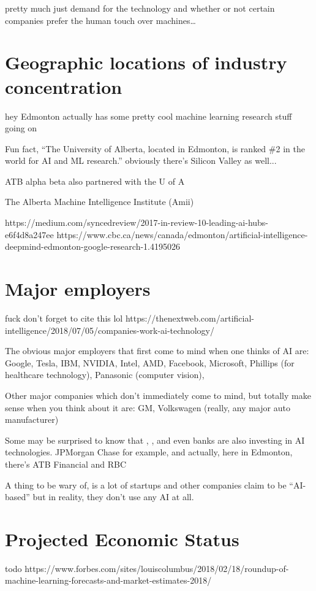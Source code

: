 \documentclass[letterpaper,12pt]{article}
\begin{document}
pretty much just demand for the technology and whether or not
certain companies prefer the human touch over machines\dots

\section{Geographic locations of industry concentration}
hey Edmonton actually has some pretty cool machine learning research stuff
going on

Fun fact, ``The University of Alberta, located in Edmonton, is ranked \#2 in the world for AI and ML research.''
obviously there's Silicon Valley as well...

ATB alpha beta
also partnered with the U of A

The
Alberta
Machine
Intelligence
Institute
(Amii)

https://medium.com/syncedreview/2017-in-review-10-leading-ai-hubs-e6f4d8a247ee
https://www.cbc.ca/news/canada/edmonton/artificial-intelligence-deepmind-edmonton-google-research-1.4195026

\section{Major employers}

fuck don't forget to cite this lol https://thenextweb.com/artificial-intelligence/2018/07/05/companies-work-ai-technology/

The obvious major employers that first come to mind when one thinks of AI are:
Google,
Tesla,
IBM,
NVIDIA, Intel, AMD,
Facebook,
Microsoft,
Phillips (for healthcare technology),
Panasonic (computer vision),


Other major companies which don't immediately come to mind, but totally make sense when you think about it are:
GM,
Volkswagen (really, any major auto manufacturer)

Some may be surprised to know that , , and even banks are also investing in AI technologies.
JPMorgan Chase for example, and actually, here in Edmonton, there's ATB Financial and RBC

A thing to be wary of, is a lot of startups and other companies claim to be ``AI-based''
but in reality, they don't use any AI at all. \cite{}

\section{Projected Economic Status}
todo \cite{forbesprojected}
https://www.forbes.com/sites/louiscolumbus/2018/02/18/roundup-of-machine-learning-forecasts-and-market-estimates-2018/
\end{document}
